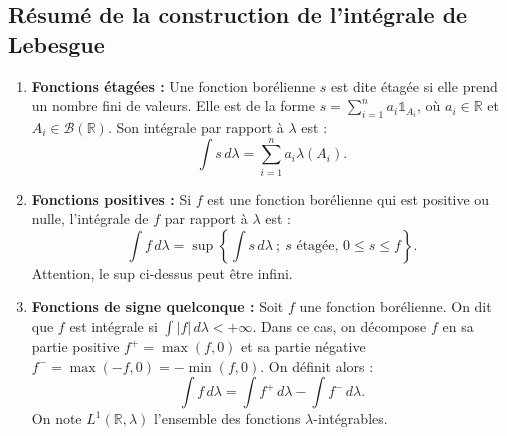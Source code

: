 \subsection*{Résumé de la construction de l'intégrale de Lebesgue}
\begin{enumerate}
    \item \textbf{Fonctions étagées :} Une fonction borélienne $s$ est dite étagée si elle prend un nombre fini de valeurs. Elle est de la forme $s = \sum_{i=1}^n a_i \mathbb{1}_{A_i}$, où $a_i \in \mathbb{R}$ et $A_i \in \mathcal{B}(\mathbb{R})$. Son intégrale par rapport à $\lambda$ est :
    \[ \int s \,d\lambda = \sum_{i=1}^n a_i \lambda(A_i). \]
    \item \textbf{Fonctions positives :} Si $f$ est une fonction borélienne qui est positive ou nulle, l'intégrale de $f$ par rapport à $\lambda$ est :
    \[ \int f \,d\lambda = \sup \left\{ \int s \,d\lambda \ ; \ s \text{ étagée, } 0 \le s \le f \right\}. \]
    Attention, le sup ci-dessus peut être infini.
    \item \textbf{Fonctions de signe quelconque :} Soit $f$ une fonction borélienne. On dit que $f$ est intégrale si $\int |f| \,d\lambda < +\infty$.
    Dans ce cas, on décompose $f$ en sa partie positive $f^+ = \max(f,0)$ et sa partie négative $f^- = \max(-f,0) = -\min(f,0)$. On définit alors :
    \[ \int f \,d\lambda = \int f^+ \,d\lambda - \int f^- \,d\lambda. \]
    On note $L^1(\mathbb{R}, \lambda)$ l'ensemble des fonctions $\lambda$-intégrables.
\end{enumerate}
